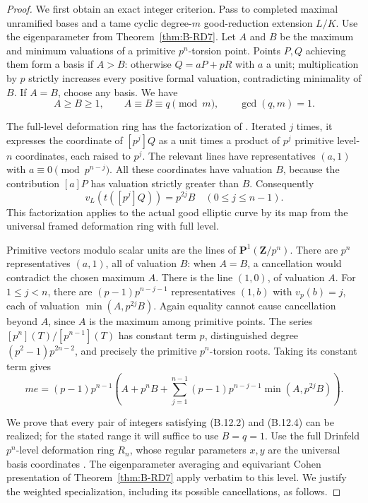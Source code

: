 \begin{proof}
We first obtain an exact integer criterion. Pass to completed maximal
unramified bases and a tame cyclic degree-$m$ good-reduction extension
$L/K$. Use the eigenparameter from Theorem~\ref{thm:B-RD7}.
Let $A$ and $B$ be the maximum and minimum valuations of a primitive
$p^n$-torsion point. Points $P,Q$ achieving them form a basis if $A>B$:
otherwise $Q=aP+pR$ with $a$ a unit; multiplication by $p$ strictly
increases every positive formal valuation, contradicting minimality
of $B$. If $A=B$, choose any basis. We have
\[
 A\geq B\geq1,\qquad A\equiv B\equiv q\pmod m,
 \qquad \gcd(q,m)=1.                              \tag{B.12.2}
\]

The full-level deformation ring has the factorization of
\cite[Proposition~2.2.3(vii)]{CarterStrauch2021LubinTate}.
Iterated $j$ times, it expresses the coordinate of $[p^j]Q$ as a unit
times a product of $p^j$ primitive level-$n$ coordinates, each raised
to $p^j$. The relevant lines have representatives $(a,1)$ with
$a\equiv0\pmod {p^{n-j}}$. All these coordinates have valuation $B$,
because the contribution $[a]P$ has valuation strictly greater than
$B$. Consequently
\[
 v_L(t([p^j]Q))=p^{2j}B\quad(0\leq j\leq n-1).   \tag{B.12.3}
\]
This factorization applies to the actual good elliptic curve by its
map from the universal framed deformation ring with full level.

Primitive vectors modulo scalar units are the lines of
$\mathbf P^1(\mathbf Z/p^n)$. There are $p^n$ representatives $(a,1)$,
all of valuation $B$: when $A=B$, a cancellation would contradict the
chosen maximum $A$. There is the line $(1,0)$, of valuation $A$.
For $1\leq j<n$, there are $(p-1)p^{n-j-1}$ representatives $(1,b)$
with $v_p(b)=j$, each of valuation $\min(A,p^{2j}B)$. Again equality
cannot cause cancellation beyond $A$, since $A$ is the maximum among
primitive points. The series $[p^n](T)/[p^{n-1}](T)$ has constant term
$p$, distinguished degree $(p^2-1)p^{2n-2}$, and precisely the
primitive $p^n$-torsion roots. Taking its constant term gives
\[
 me=(p-1)p^{n-1}\left(
 A+p^nB+\sum_{j=1}^{n-1}(p-1)p^{n-j-1}
                \min(A,p^{2j}B)\right).          \tag{B.12.4}
\]

We prove that every pair of integers satisfying (B.12.2) and (B.12.4)
can be realized; for the stated range it will suffice to use $B=q=1$.
Use the full Drinfeld $p^n$-level deformation ring $R_n$, whose regular
parameters $x,y$ are the universal basis coordinates
\cite[Theorem~2.1.2 and Proposition~2.2.3(i)]{CarterStrauch2021LubinTate}.
The eigenparameter averaging and equivariant Cohen presentation of
Theorem~\ref{thm:B-RD7} apply verbatim to this level.
We justify the weighted specialization, including its possible
cancellations, as follows.


\end{proof}
